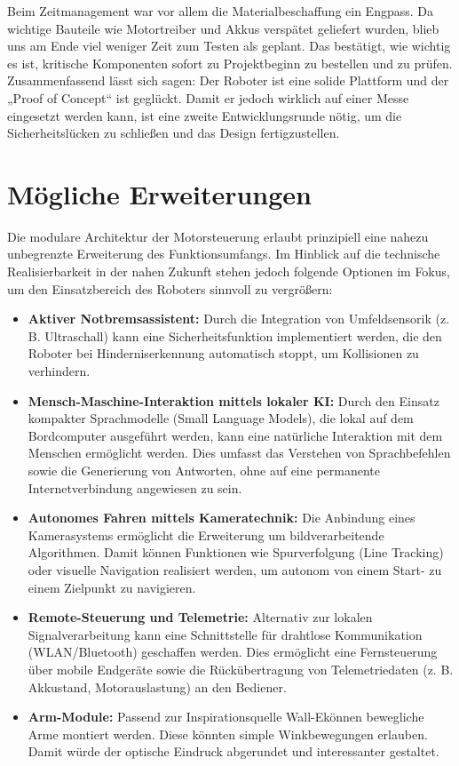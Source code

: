 Beim Zeitmanagement war vor allem die Materialbeschaffung ein Engpass. Da wichtige Bauteile wie Motortreiber und Akkus verspätet geliefert wurden, blieb uns am Ende viel weniger Zeit zum Testen als geplant. Das bestätigt, wie wichtig es ist, kritische Komponenten sofort zu Projektbeginn zu bestellen und zu prüfen. Zusammenfassend lässt sich sagen: Der Roboter ist eine solide Plattform und der „Proof of Concept“ ist geglückt. Damit er jedoch wirklich auf einer Messe eingesetzt werden kann, ist eine zweite Entwicklungsrunde nötig, um die Sicherheitslücken zu schließen und das Design fertigzustellen.

\section{Mögliche Erweiterungen}
\label{cha:Mögliche Erweiterungen}

Die modulare Architektur der Motorsteuerung erlaubt prinzipiell eine nahezu unbegrenzte Erweiterung des Funktionsumfangs. Im Hinblick auf die technische Realisierbarkeit in der nahen Zukunft stehen jedoch folgende Optionen im Fokus, um den Einsatzbereich des Roboters sinnvoll zu vergrößern:

\begin{itemize}
	\item \textbf{Aktiver Notbremsassistent:} Durch die Integration von Umfeldsensorik (z. B. Ultraschall) kann eine Sicherheitsfunktion implementiert werden, die den Roboter bei Hinderniserkennung automatisch stoppt, um Kollisionen zu verhindern.
	
	\item \textbf{Mensch-Maschine-Interaktion mittels lokaler KI:} Durch den Einsatz kompakter Sprachmodelle (Small Language Models), die lokal auf dem Bordcomputer ausgeführt werden, kann eine natürliche Interaktion mit dem Menschen ermöglicht werden. Dies umfasst das Verstehen von Sprachbefehlen sowie die Generierung von Antworten, ohne auf eine permanente Internetverbindung angewiesen zu sein.
	
	\item \textbf{Autonomes Fahren mittels Kameratechnik:} Die Anbindung eines Kamerasystems ermöglicht die Erweiterung um bildverarbeitende Algorithmen. Damit können Funktionen wie Spurverfolgung (Line Tracking) oder visuelle Navigation realisiert werden, um autonom von einem Start- zu einem Zielpunkt zu navigieren.
	
	\item \textbf{Remote-Steuerung und Telemetrie:} Alternativ zur lokalen Signalverarbeitung kann eine Schnittstelle für drahtlose Kommunikation (WLAN/Bluetooth) geschaffen werden. Dies ermöglicht eine Fernsteuerung über mobile Endgeräte sowie die Rückübertragung von Telemetriedaten (z. B. Akkustand, Motorauslastung) an den Bediener.
	
	\item \textbf{Arm-Module:} Passend zur Inspirationsquelle Wall-E\reg können bewegliche Arme montiert werden. Diese könnten simple Winkbewegungen erlauben. Damit würde der optische Eindruck abgerundet und interessanter gestaltet.
\end{itemize}



